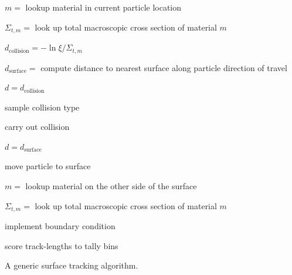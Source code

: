 \begin{algorithm}
\begin{algorithmic}[1]
    \State $m =$ lookup material in current particle location

    \State $\Sigma_{t,m} =$ look up total macroscopic cross section of material $m$ 

    
        \State $d_{\text{collision}} = -\ln{\xi} / \Sigma_{t,m} $
        
        \State $d_{\text{surface}} =$ compute distance to nearest surface along particle direction of travel


                \State $d = d_{\text{collision}}$
                
                \State sample collision type
                
                \State carry out collision
                
            \Else 

                \State $d = d_{\text{surface}}$
        
                \State move particle to surface
    
                \State $m =$ lookup material on the other side of the surface
    
                \State $\Sigma_{t,m} =$ look up total macroscopic cross section of material $m$ 
    
    
                    \State implement boundary condition
    
                \EndIf
        \EndIf
        \State score track-lengths to tally bins
    \EndWhile
    \caption{A generic surface tracking algorithm.}
    \label{alg:surface}
\end{algorithmic}
\end{algorithm}


